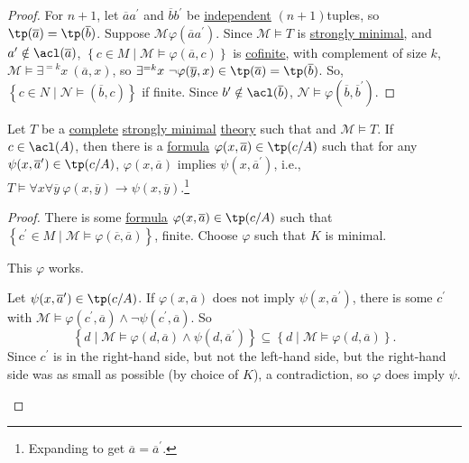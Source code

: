 \begin{proof}
	For \(n + 1\), let \(\overline{a} a^{\prime} \) and \(\overline{b} b^{\prime} \) be \hyperref[def:independent]{independent} \((n+1)\)tuples, so \(\tp(\overline{a} ) = \tp(\overline{b} )\). Suppose \(\mathcal{M} \varphi (\overline{a} a^{\prime} )\). Since \(\mathcal{M} \models T\) is \hyperref[def:strongly-minimal]{strongly minimal}, and \(a^{\prime} \notin\acl(\overline{a} )\), \(\left\{ c\in M \mid \mathcal{M} \models \varphi (\overline{a} , c) \right\} \) is \hyperref[def:cofinite]{cofinite}, with complement of size \(k\), \(\mathcal{M} \models \exists ^{=k}x\ (\overline{a} , x)\), so \(\exists ^{=k}x\ \lnot \varphi (\overline{y} , x) \in \tp(\overline{a} ) = \tp(\overline{b} )\). So, \(\left\{ c\in N \mid \mathcal{N} \models (\overline{b} , c) \right\} \) if finite. Since \(b^{\prime} \notin \acl(\overline{b} )\), \(\mathcal{N} \models \varphi (\overline{b} , \overline{b} ^{\prime} )\).
\end{proof}

\begin{lemma}\label{lma:lec19}
	Let \(T\) be a \hyperref[def:theory-complete]{complete} \hyperref[def:strongly-minimal]{strongly minimal} \hyperref[def:theory]{theory} such that and \(\mathcal{M} \models T\). If \(c\in \acl(A)\), then there is a \hyperref[def:formula]{formula} \(\varphi (x, \overline{a} ) \in \tp(c / A)\) such that for any \(\psi (x, \overline{a} ^{\prime} ) \in \tp(c / A)\), \(\varphi (x, \overline{a} )\) implies \(\psi (x, \overline{a} ^{\prime} )\), i.e., \(T \models \forall x \forall \overline{y} \ \varphi (x, \overline{y} ) \to \psi (x, \overline{y} )\).\footnote{Expanding to get \(\overline{a}  = \overline{a} ^{\prime} \).}
\end{lemma}
\begin{proof}
	There is some \hyperref[def:formula]{formula} \(\varphi (x, \overline{a} )\in \tp(c / A)\) such that \(\left\{ c^{\prime} \in M \mid \mathcal{M} \models \varphi (\overline{c} , \overline{a} ) \right\} \), finite. Choose \(\varphi \) such that \(K\) is minimal.

	\begin{claim}
		This \(\varphi \) works.
	\end{claim}
	\begin{explanation}
		Let \(\psi (x, \overline{a} ^{\prime} )\in \tp(c / A)\). If \(\varphi (x, \overline{a} )\) does not imply \(\psi (x, \overline{a} ^{\prime} )\), there is some \(c^{\prime} \) with \(\mathcal{M} \models \varphi (c^{\prime} , \overline{a} ) \land \lnot \psi (c^{\prime} , \overline{a} )\). So
		\[
			\left\{ d \mid \mathcal{M} \models \varphi (d, \overline{a} ) \land \psi (d, \overline{a} ^{\prime} ) \right\} \subseteq \left\{ d \mid \mathcal{M} \models \varphi (d, \overline{a} ) \right\}.
		\]
		Since \(c^{\prime} \) is in the right-hand side, but not the left-hand side, but the right-hand side was as small as possible (by choice of \(K\)), a contradiction, so \(\varphi \) does imply \(\psi \).
	\end{explanation}
\end{proof}

